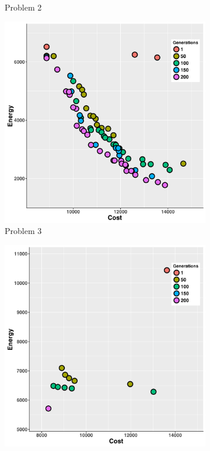\begin{figure}
\begin{subfigure}[b]{0.45\textwidth}
   \caption{Problem 2}
   \label{fig:b}
   \end{subfigure}
   \begin{subfigure}[b]{0.45\textwidth}\includegraphics[width=\textwidth]{pics/preliminary/without/testCase3_.png}
   \caption{Problem 3}
   \label{fig:c}
   \end{subfigure}
   \begin{subfigure}[b]{0.45\textwidth}\includegraphics[width=\textwidth]{pics/preliminary/without/testCase4_.png}

\end{subfigure}
\end{figure}
